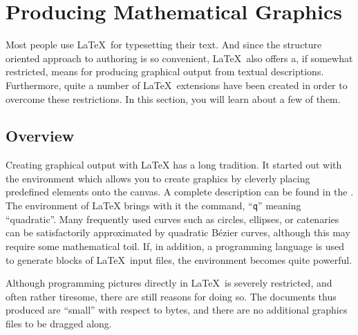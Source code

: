 \newcommand{\graphicscompanion}{\emph{The \LaTeX{} Graphics Companion}~\cite{graphicscompanion}}
\newcommand{\hobby}{\citetitle{metapost}~\cite{metapost}}
\newcommand{\hoenig}{\emph{\TeX{} Unbound}~\cite{unbound}}
\newcommand{\graphicsinlatex}{\emph{Graphics in \LaTeXe{}}~\cite{ursoswald}}

\chapter{Producing Mathematical Graphics}\label{chap:graphics}

\begin{intro}
  Most people use \LaTeX\ for typesetting their text. And since the structure oriented approach to authoring is so convenient, \LaTeX\ also offers a,
  if somewhat restricted, means for producing graphical output from textual
  descriptions. Furthermore, quite a number of \LaTeX\ extensions have been created
  in order to overcome these restrictions. In this section, you will learn about a
  few of them.
\end{intro}

\section{Overview}

Creating graphical output with \LaTeX{} has a long tradition. It started out
with the  environment which allows you to create graphics by
cleverly placing predefined elements onto the canvas. A complete
description can be found in the \manual. The  environment of
\LaTeX{} brings with it the  command, ``\texttt{q}'' meaning
``quadratic''.  Many frequently used curves such as circles, ellipses, or
catenaries can be satisfactorily approximated by quadratic B\'ezier curves,
although this may require some mathematical toil. If, in addition, a
programming language is used to generate  blocks of \LaTeX\
input files, the  environment becomes quite powerful.

Although programming pictures directly in \LaTeX\ is severely restricted,
and often rather tiresome, there are still reasons for doing so. The documents
thus produced are ``small'' with respect to bytes, and there are no additional
graphics files to be dragged along.

